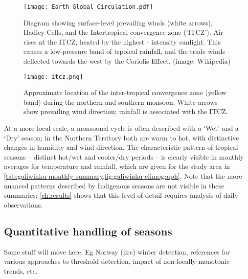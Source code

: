 \begin{figure}[p]
    \centering
    \texttt{[image: Earth\_Global\_Circulation.pdf]}
    \caption[Hadley Cells and trade-winds]{
        Diagram showing surface-level prevailing winds (white arrows),
        Hadley Cells, and the Intertropical convergence zone (`ITCZ').
        Air rises at the ITCZ, heated by the highest - intensity sunlight.
        This causes a low-pressure band of trpoical rainfall, and the
        trade winds -- deflected towards the west by the Coriolis Effect.
        (image: Wikipedia)}
    \label{fig:hadley-cells}
\vspace{1cm}
    \texttt{[image: itcz.png]}
    \caption[ITCZ showing northern and southern monsoon]{
        Approximate location of the inter-tropical convergence zone
        (yellow band) during the northern and southern monsoon.
        White arrows show prevailing wind direction; rainfall is
        associated with the ITCZ.  \citep[image:][]{boos2014}}
    \label{fig:itcz-india-aus}
\end{figure}

At a more local scale, a monsoonal cycle is often described with a `Wet' and a
`Dry' season; in the Northern Territory both are warm to hot, with distinctive
changes in humidity and wind direction.  The characteristic pattern of tropical
seasons -- distinct hot/wet and cooler/dry periods -- is clearly visible in
monthly averages for temperature and rainfall, which are given for the study
area in \cref{tab:galiwinku-monthly-summary,fig:galiwinku-climograph}.
Note that the more nuanced patterns described by Indigenous seasons are not
visible in these summaries; \cref{ch:results} shows that this level of detail
requires analysis of daily observations.




\subsection{Quantitative handling of seasons}

Some stuff will move here.  Eg Norway (iirc) winter detection,
references for various approaches to threshold detection,
impact of non-locally-monotonic trends, etc.

